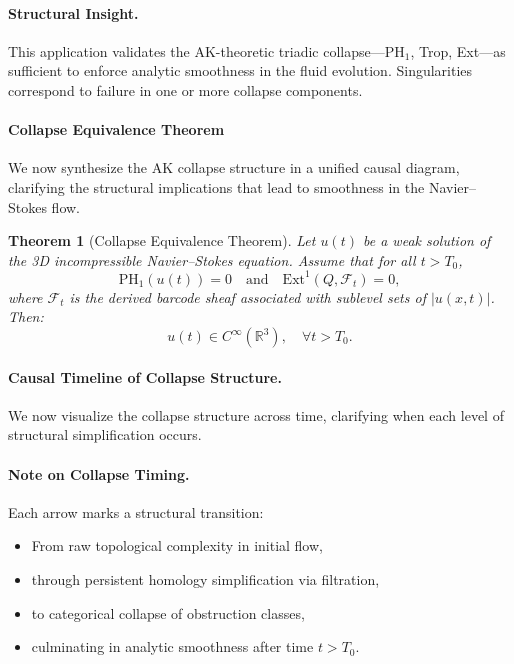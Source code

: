 \documentclass[11pt]{article}
\newtheorem{theorem}{Theorem}[section]
\begin{document}
\paragraph{Structural Insight.}
This application validates the AK-theoretic triadic collapse—PH$_1$, Trop, Ext—as sufficient to enforce analytic smoothness in the fluid evolution. Singularities correspond to failure in one or more collapse components.

\paragraph{Collapse Equivalence Theorem}
We now synthesize the AK collapse structure in a unified causal diagram,  
clarifying the structural implications that lead to smoothness in the Navier--Stokes flow.

\begin{theorem}[Collapse Equivalence Theorem]
Let \( u(t) \) be a weak solution of the 3D incompressible Navier–Stokes equation.  
Assume that for all \( t > T_0 \),
\[
\mathrm{PH}_1(u(t)) = 0 \quad \text{and} \quad \mathrm{Ext}^1(Q, \mathcal{F}_t) = 0,
\]
where \( \mathcal{F}_t \) is the derived barcode sheaf associated with sublevel sets of \( |u(x,t)| \).  
Then:
\[
u(t) \in C^\infty(\mathbb{R}^3), \quad \forall t > T_0.
\]
\end{theorem}

\paragraph{Causal Timeline of Collapse Structure.}
We now visualize the collapse structure across time, clarifying when each level of structural simplification occurs.

\begin{center}
\end{center}

\paragraph{Note on Collapse Timing.}
Each arrow marks a structural transition:
\begin{itemize}
  \item From raw topological complexity in initial flow,
  \item through persistent homology simplification via filtration,
  \item to categorical collapse of obstruction classes,
  \item culminating in analytic smoothness after time \( t > T_0 \).
\end{itemize}
\end{document}

